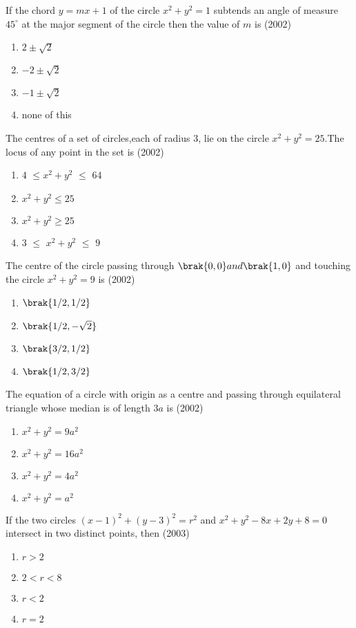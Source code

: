  \iffalse
    \title{Assignment 1}
    \author{Srihaas Gunda}
    \section{mains}
 \fi

\item If the chord $y=mx+1$ of the circle $x^2+y^2=1$ subtends an angle of measure \( 45^\circ \) at the major segment of the circle then the value of $m$ is \hfill(2002)
\begin{enumerate}
\item$2\pm\sqrt{2}$
\item$-2\pm\sqrt{2}$
\item$-1\pm\sqrt{2}$
\item none of this
\end{enumerate}
\item The centres of a set of circles,each of radius $3$, lie on the circle $x^2+y^2=25$.The locus of any point in the set is \hfill(2002)
\begin{enumerate}
\item$4$ $\leq$$x^2+y^2$ $\leq$ $64$
\item$x^2+y^2\leq25$
\item$x^2+y^2\geq25$
\item$3$ $\leq$ $x^2+y^2$ $\leq$ $9$
\end{enumerate}
\item The centre of the circle passing through $\brak{0,0} and \brak{1,0}$ and touching the circle $x^2+y^2=9$ is \hfill(2002)
\begin{enumerate}
\item$\brak{1/2,1/2}$
\item$\brak{1/2,-\sqrt{2}}$
\item$\brak{3/2,1/2}$
\item$\brak{1/2,3/2}$
\end{enumerate}
\item The equation of a circle with origin as a centre and passing through equilateral triangle whose median is of length $3a$ is \hfill(2002)
\begin{enumerate}
\item$x^2+y^2=9a^2$
\item$x^2+y^2=16a^2$
\item$x^2+y^2=4a^2$
\item$x^2+y^2=a^2$
\end{enumerate}
\item If the two circles $(x-1)^2+(y-3)^2=r^2$ and $x^2+y^2-8x+2y+8=0$ intersect in two distinct points, then \hfill(2003)
\begin{enumerate}
\item$r>2$
\item$2<r<8$
\item$r<2$
\item$r=2$
\end{enumerate}

